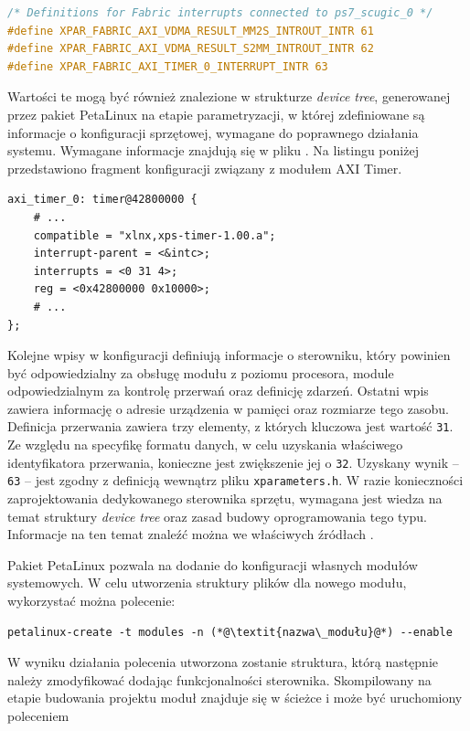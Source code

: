 \begin{lstlisting}[language=C]
/* Definitions for Fabric interrupts connected to ps7_scugic_0 */
#define XPAR_FABRIC_AXI_VDMA_RESULT_MM2S_INTROUT_INTR 61
#define XPAR_FABRIC_AXI_VDMA_RESULT_S2MM_INTROUT_INTR 62
#define XPAR_FABRIC_AXI_TIMER_0_INTERRUPT_INTR 63
\end{lstlisting}

Wartości te mogą być również znalezione w strukturze \textit{device tree}, generowanej przez pakiet PetaLinux na etapie parametryzacji, w której zdefiniowane są informacje o konfiguracji sprzętowej, wymagane do poprawnego działania systemu.
Wymagane informacje znajdują się w pliku . 
Na listingu poniżej przedstawiono fragment konfiguracji związany z modułem AXI Timer.

\begin{lstlisting}
axi_timer_0: timer@42800000 {
	# ...
	compatible = "xlnx,xps-timer-1.00.a";
	interrupt-parent = <&intc>;
	interrupts = <0 31 4>;
	reg = <0x42800000 0x10000>;
	# ...
};
\end{lstlisting}
Kolejne wpisy w konfiguracji definiują informacje o sterowniku, który powinien być odpowiedzialny za obsługę modułu z poziomu procesora, module odpowiedzialnym za kontrolę przerwań oraz definicję zdarzeń. 
Ostatni wpis zawiera informację o adresie urządzenia w pamięci oraz rozmiarze tego zasobu.
Definicja przerwania zawiera trzy elementy, z których kluczowa jest wartość \texttt{31}. 
Ze względu na specyfikę formatu danych, w celu uzyskania właściwego identyfikatora przerwania, konieczne jest zwiększenie jej o \texttt{32}. Uzyskany wynik -- \texttt{63} -- jest zgodny z definicją wewnątrz pliku \texttt{xparameters.h}.
W razie konieczności zaprojektowania dedykowanego sterownika sprzętu, wymagana jest wiedza na temat struktury \textit{device tree} oraz zasad budowy oprogramowania tego typu. 
Informacje na ten temat znaleźć można we właściwych źródłach \cite{Corbet2005,device-tree-tutorial}.

Pakiet PetaLinux pozwala na dodanie do konfiguracji własnych modułów systemowych. 
W celu utworzenia struktury plików dla nowego modułu, wykorzystać można polecenie:

\begin{lstlisting}[breaklines=true]
petalinux-create -t modules -n (*@\textit{nazwa\_modułu}@*) --enable
\end{lstlisting}

W wyniku działania polecenia utworzona zostanie struktura, którą następnie należy zmodyfikować dodając funkcjonalności sterownika.
Skompilowany na etapie budowania projektu moduł znajduje się w ścieżce  i może być uruchomiony poleceniem

